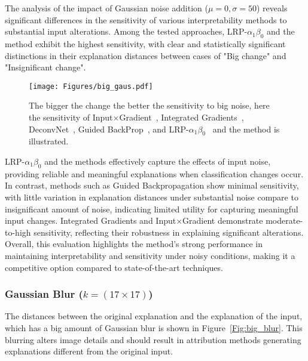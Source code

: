 The analysis of the impact of Gaussian noise addition ($\mu = 0, \sigma = 50$) reveals significant differences in the sensitivity of various interpretability methods to substantial input alterations. Among the tested approaches, LRP-$\alpha_1\beta_0$ and the \CTC\/ method exhibit the highest sensitivity, with clear and statistically significant distinctions in their explanation distances between cases of "Big change" and "Insignificant change". 

\begin{figure}[ht!]
	\begin{center}
		\texttt{[image: Figures/big\_gaus.pdf]}
	\end{center}
	\caption{The bigger the change the better the sensitivity to big noise, here the sensitivity of Input$\times$Gradient~\cite{SimonyanVZ13}, Integrated Gradients~\cite{SundararajanTY17}, DeconvNet~\cite{ZeilerKTF10}, Guided BackProp~\cite{SpringenbergDBR14}, and LRP-$\alpha_1\beta_0$~\cite{bach2015pixel} and the \CTC\/ method is illustrated.}
	\label{Fig:big_gaus}
\end{figure} 

LRP-$\alpha_1\beta_0$ and the \CTC\/ methods effectively capture the effects of input noise, providing reliable and meaningful explanations when classification changes occur. In contrast, methods such as Guided Backpropagation show minimal sensitivity, with little variation in explanation distances under substantial noise compare to insignificant amount of noise, indicating limited utility for capturing meaningful input changes. Integrated Gradients and Input$\times$Gradient demonstrate moderate-to-high sensitivity, reflecting their robustness in explaining significant alterations. Overall, this evaluation highlights the \CTC\/ method's strong performance in maintaining interpretability and sensitivity under noisy conditions, making it a competitive option compared to state-of-the-art techniques.


\subsubsection{Gaussian Blur ($k = (17 \times 17)$)}
The distances between the original explanation and the explanation of the input, which has a big amount of Gaussian blur is shown in Figure~\ref{Fig:big_blur}. This blurring alters image details and should result in attribution methods generating explanations different from the original input.


